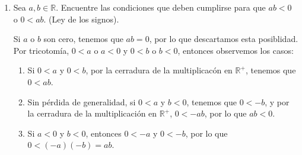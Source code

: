 \documentclass[11pt]{article}
\newcommand{\R}{\mathbb{R}}
\newcommand{\bfit}[1]{\textbf{\textit{#1}}}
\begin{document}
\begin{enumerate}[label=\alph*)]
 \bfit{Corolario:} Si $a<0$, entonces $a^{-1}<0$.%
 \begin{proof}
 Sea $a<0$, sabemos que $-a>0$, por lo que $-a^{-1}>0$, de donde sigue que $a^{-1}<0$. \qedhere
 \end{proof}

 \item Sea $a,b\in \R$. Encuentre las condiciones que deben cumplirse para que $ab<0$ o $0<ab$. (Ley de los signos).
 
 Si $a$ o $b$ son cero, tenemos que $ab=0$, por lo que descartamos esta posiblidad. Por tricotomía, $0<a$ o $a<0$ y $0<b$ o $b<0$, entonces observemos los casos:
 \begin{enumerate}[label=\roman*)]
  \item Si $0<a$ y $0<b$, por la cerradura de la multiplicacón en $\R^+$, tenemos que $0<ab$.
  \item Sin pérdida de generalidad, si $0<a$ y $b<0$, tenemos que $0<-b$, y por la cerradura de la multiplicación en $\R^+$, $0<-ab$, por lo que $ab<0$.
  \item Si $a<0$ y $b<0$, entonces $0<-a$ y $0<-b$, por lo que $0<(-a)(-b)=ab$.
 \end{enumerate}


\end{enumerate}
\end{document}
